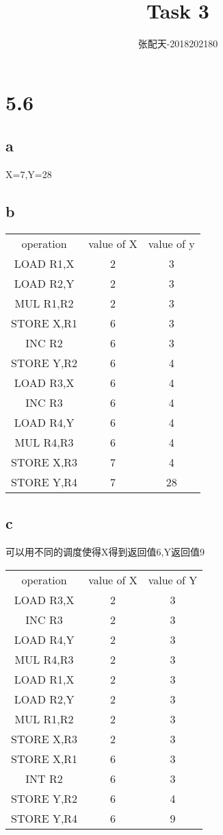 \documentclass[UTF8]{ctexart}
\title{Task 3}
\author{张配天-2018202180}
\date{}
\begin{document}
    \maketitle
    \section{5.6}
    \subsection{a}
    X=7,Y=28
    \subsection{b}
    \begin{table}[h]
        \centering
        \begin{tabular}{ccc}
            \hline
            operation&value of X&value of y\\
            LOAD R1,X&2&3\\
            LOAD R2,Y&2&3\\
            MUL R1,R2&2&3\\
            STORE X,R1&6&3\\
            INC R2&6&3\\
            STORE Y,R2&6&4\\
            LOAD R3,X&6&4\\
            INC R3&6&4\\
            LOAD R4,Y&6&4\\
            MUL R4,R3&6&4\\
            STORE X,R3&7&4\\
            STORE Y,R4&7&28\\
            \hline
        \end{tabular}
    \end{table}
    \subsection{c}
    可以用不同的调度使得X得到返回值6,Y返回值9
    \begin{table}[htb]
        \centering
        \begin{tabular}{ccc}
            \hline
            operation&value of X&value of Y\\
            LOAD R3,X&2&3\\
            INC R3&2&3\\
            LOAD R4,Y&2&3\\
            MUL R4,R3&2&3\\
            LOAD R1,X&2&3\\
            LOAD R2,Y&2&3\\
            MUL R1,R2&2&3\\
            STORE X,R3&2&3\\
            STORE X,R1&6&3\\
            INT R2&6&3\\
            STORE Y,R2&6&4\\
            STORE Y,R4&6&9\\
            \hline
        \end{tabular}
    \end{table}
    \newpage
\end{document}
